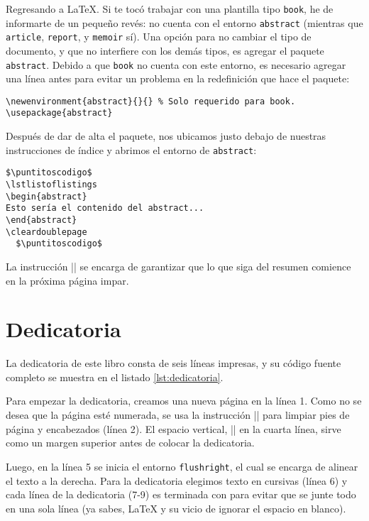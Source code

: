 Regresando a \LaTeX. Si te tocó trabajar con una plantilla tipo \texttt{book}, he de informarte de un pequeño revés: no cuenta con el entorno \texttt{abstract} (mientras que \texttt{article}, \texttt{report}, y \texttt{memoir} sí). Una opción para no cambiar el tipo de documento, y que no interfiere con los demás tipos, es agregar el paquete \texttt{abstract}. Debido a que \texttt{book} no cuenta con este entorno, es necesario agregar una línea antes para evitar un problema en la redefinición que hace el paquete:

\begin{lstlisting}[style=latex]
\newenvironment{abstract}{}{} % Solo requerido para book.
\usepackage{abstract}
\end{lstlisting}

Después de dar de alta el paquete, nos ubicamos justo debajo de nuestras instrucciones de índice y abrimos el entorno de \texttt{abstract}:

\begin{lstlisting}[style=latex]
  $\puntitoscodigo$
\lstlistoflistings
\begin{abstract}
Esto sería el contenido del abstract...
\end{abstract}
\cleardoublepage
  $\puntitoscodigo$
\end{lstlisting}

La instrucción |\cleardoublepage| se encarga de garantizar que lo que siga del resumen comience en la próxima página impar.



\section{Dedicatoria}
\label{sec:dedicatoria}



La dedicatoria de este libro consta de seis líneas impresas, y su código fuente completo se muestra en el listado \ref{lst:dedicatoria}.

Para empezar la dedicatoria, creamos una nueva página en la línea 1. Como no se desea que la página esté numerada, se usa la instrucción |\thispagestyle{empty}| para limpiar pies de página y encabezados (línea 2). El espacio vertical, |\vspace*| en la cuarta línea, sirve como un margen superior antes de colocar la dedicatoria.

Luego, en la línea 5 se inicia el entorno \texttt{flushright}, el cual se encarga de alinear el texto a la derecha. Para la dedicatoria elegimos texto en cursivas (línea 6) y cada línea de la dedicatoria (7-9) es terminada con \codigo{\textbackslash{}} para evitar que se junte todo en una sola línea (ya sabes, \LaTeX{} y su vicio de ignorar el espacio en blanco).


